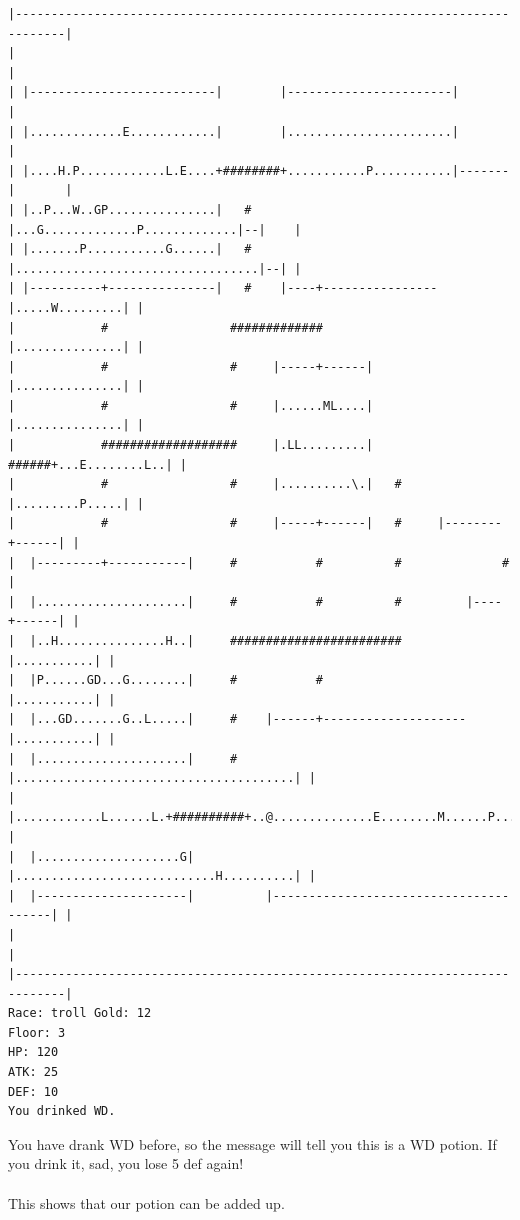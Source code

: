 \documentclass[11pt]{article}
\theoremstyle{plain}
\begin{document}
\begin{Verbatim}[fontsize=\scriptsize]
|-----------------------------------------------------------------------------|
|                                                                             |
| |--------------------------|        |-----------------------|               |
| |.............E............|        |.......................|               |
| |....H.P............L.E....+########+...........P...........|-------|       |
| |..P...W..GP...............|   #    |...G.............P.............|--|    |
| |.......P...........G......|   #    |..................................|--| |
| |----------+---------------|   #    |----+----------------|.....W.........| |
|            #                 #############                |...............| |
|            #                 #     |-----+------|         |...............| |
|            #                 #     |......ML....|         |...............| |
|            ###################     |.LL.........|   ######+...E........L..| |
|            #                 #     |..........\.|   #     |.........P.....| |
|            #                 #     |-----+------|   #     |--------+------| |
|  |---------+-----------|     #           #          #              #        |
|  |.....................|     #           #          #         |----+------| |
|  |..H...............H..|     ########################         |...........| |
|  |P......GD...G........|     #           #                    |...........| |
|  |...GD.......G..L.....|     #    |------+--------------------|...........| |
|  |.....................|     #    |.......................................| |
|  |............L......L.+##########+..@..............E........M......P.....| |
|  |....................G|          |............................H..........| |
|  |---------------------|          |---------------------------------------| |
|                                                                             |
|-----------------------------------------------------------------------------|
Race: troll Gold: 12                                                   Floor: 3
HP: 120
ATK: 25
DEF: 10
You drinked WD. 
\end{Verbatim}

You have drank WD before, so the message will tell you this is a WD potion.
If you drink it, sad, you lose 5 def again!\\\\

This shows that our potion can be added up.
\end{document}
